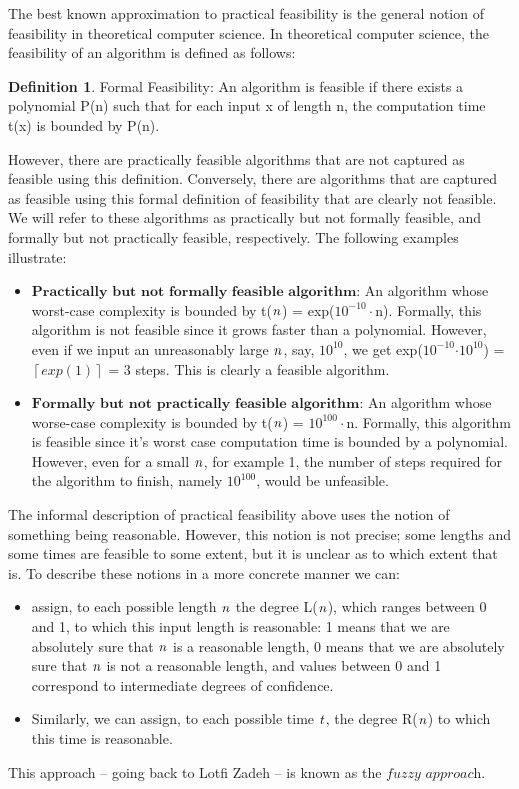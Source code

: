 \documentclass[draft]{article}
\theoremstyle{definition}
\newtheorem{definition}{Definition}[section]
\begin{document}
The best known approximation to practical feasibility is the general notion of feasibility in theoretical computer science. In theoretical computer science, the feasibility of an algorithm is defined as follows:

\begin{definition} Formal Feasibility:
    An algorithm is feasible if there exists a polynomial P(n) such that for each input x of length n, the computation time t(x) is bounded by P(n). 
\end{definition}

However, there are practically feasible algorithms that are not captured as feasible using this definition. Conversely, there are algorithms that are captured as feasible using this formal definition of feasibility that are clearly not feasible. We will refer to these algorithms as practically but not formally feasible, and formally but not practically feasible, respectively. The following examples illustrate:
    \begin{itemize}
        \item $\textbf{Practically but not formally feasible algorithm:}$ An algorithm whose worst-case complexity is bounded by t($\it{n}$) = exp($10^{-10}\cdot$n). Formally, this algorithm is not feasible since it grows faster than a polynomial. However, even if we input an unreasonably large $\it{n}$, say, $10^{10}$, we get exp($10^{-10}$$\cdot$$10^{10}$) = $\left \lceil{exp(1)}\right \rceil$ = 3 steps. This is clearly a feasible algorithm. 
        \item $\textbf{Formally but not practically feasible algorithm:}$ An algorithm whose worse-case complexity is bounded by t($\it{n}$) = $10^{100}\cdot$n. Formally, this algorithm is feasible since it's worst case computation time is bounded by a polynomial. However, even for a small $\it{n}$, for example 1, the number of steps required for the algorithm to finish, namely $10^{100}$, would be unfeasible.  
    \end{itemize}     

The informal description of practical feasibility above uses the notion of something being reasonable. However, this notion is not precise; some lengths and some times are feasible to some extent, but it is unclear as to which extent that is. To describe these notions in a more concrete manner we can:

    \begin{itemize}
        \item assign, to each possible length $\it{n}$ the degree L($\it{n}$), which ranges between 0 and 1, to which this input length is reasonable: 1 means that we are absolutely sure that $\it{n}$ is a reasonable length, 0 means that we are absolutely sure that $\it{n}$ is not a reasonable length, and values between 0 and 1 correspond to intermediate degrees of confidence. 
        \item Similarly, we can assign, to each possible time $\it{t}$, the degree R($\it{n}$) to which this time is reasonable. 
    \end{itemize}
This approach – going back to Lotfi Zadeh – is known as the $\textit{fuzzy approach.}$ 
\medskip
\end{document}
